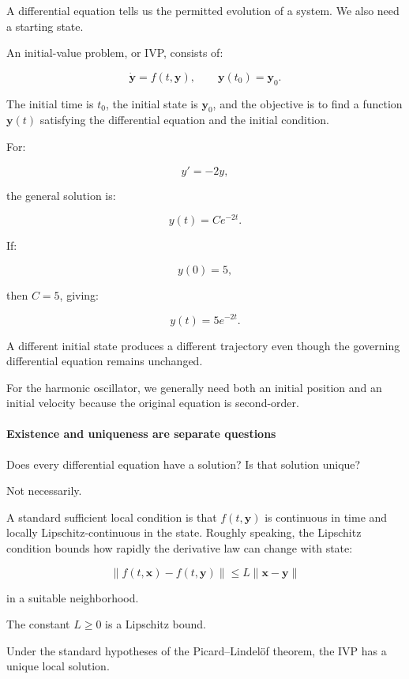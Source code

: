 A differential equation tells us the permitted evolution of a system. We also need a starting state.

An initial-value problem, or IVP, consists of:

\[
\boxed{ \dot{\mathbf y}=f(t,\mathbf y), \qquad \mathbf y(t_0)=\mathbf y_0 }.
\]

The initial time is \(t_0\), the initial state is \(\mathbf y_0\), and the objective is to find a function \(\mathbf y(t)\) satisfying the differential equation and the initial condition.

For:

\[
y'=-2y,
\]

the general solution is:

\[
y(t)=Ce^{-2t}.
\]

If:

\[
y(0)=5,
\]

then \(C=5\), giving:

\[
\boxed{y(t)=5e^{-2t}}.
\]

A different initial state produces a different trajectory even though the governing differential equation remains unchanged.

For the harmonic oscillator, we generally need both an initial position and an initial velocity because the original equation is second-order.

\paragraph{Existence and uniqueness are separate questions}\label{02-foundations-ii-ch022-existence-and-uniqueness-are-separate-questions}

\hypertarget{02-foundations-ii-ch022-existence-and-uniqueness-are-separate-questions}{}

Does every differential equation have a solution? Is that solution unique?

Not necessarily.

A standard sufficient local condition is that \(f(t,\mathbf y)\) is continuous in time and locally Lipschitz-continuous in the state. Roughly speaking, the Lipschitz condition bounds how rapidly the derivative law can change with state:

\[
\|f(t,\mathbf x)-f(t,\mathbf y)\| \le L\|\mathbf x-\mathbf y\|
\]

in a suitable neighborhood.

The constant \(L\ge0\) is a Lipschitz bound.

Under the standard hypotheses of the Picard--Lindelöf theorem, the IVP has a unique local solution.

